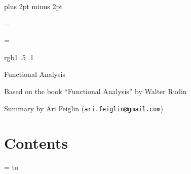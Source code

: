 




\parindent=0pt
\parskip=3pt plus 2pt minus 2pt



\footline={}


\headline={}

\color rgb{1 .5 .1}

{\def\boxshadowcolor{rgb{.8 .6 0}}

    \centerline{Functional Analysis}
    \smallskip
    \centerline{Based on the book ``Functional Analysis'' by Walter Rudin}
    \centerline{Summary by Ari Feiglin ({\tt ari.feiglin@gmail.com})}

\eppbox

\bigskip

    \section*{Contents}
    
    \tableofcontents
\eppbox

}

\vfill\break

\color{black}

\newif\ifpageodd
\pageoddtrue
\headline={%
    \hbox to \hsize{\color{black}%
        \ifpageodd\hfil{\it\currsubsection\quad\bf\folio}\global\pageoddfalse%
        \else{\bf\folio\quad\it\currsubsection}\hfil\global\pageoddtrue\fi%
    }%
}



\bye
